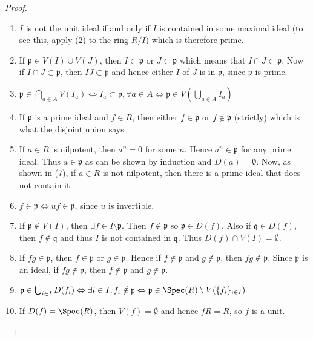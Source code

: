 \begin{proof}
\begin{enumerate}
$S = \{1, f, f^2, \ldots\}$ is a multiplicative subset, not containing $0$.
Take a
prime ideal $\bar{\mathfrak{p}} \subset S^{-1}R$ containing $S^{-1}I$. Then the
pull-back $\mathfrak{p}$ in $R$ of $\bar{\mathfrak{p}}$ is a prime ideal
containing $I$ that does not intersect $S$. This shows that $\bigcap_{I \subset
\mathfrak p} \mathfrak p \subset \sqrt{I}$. Now if $a \in \sqrt{I}$, then $a^n
\in I$ for some $n$. Hence if $I \subset \mathfrak{p}$, then $a^n \in
\mathfrak{p}$. But since $\mathfrak{p}$ is prime, we have $a \in \mathfrak{p}$.
Thus the equality is shown.
\item $I$ is not the unit ideal if and only if $I$
is contained in some maximal ideal (to
see this, apply (2) to the ring $R/I$) which is therefore prime.
\item If $\mathfrak{p} \in V(I) \cup V(J)$, then $I \subset \mathfrak{p}$ or $J
\subset \mathfrak{p}$ which means that $I \cap J \subset \mathfrak{p}$. Now if
$I \cap J \subset \mathfrak{p}$, then $IJ \subset \mathfrak{p}$ and hence
either $I$ of $J$ is in $\mathfrak{p}$, since $\mathfrak{p}$ is prime.
\item $\mathfrak{p} \in \bigcap_{a \in A} V(I_a) \Leftrightarrow
I_a \subset \mathfrak{p}, \forall a \in A \Leftrightarrow
\mathfrak{p} \in V(\bigcup_{a\in A} I_a)$
\item If $\mathfrak{p}$ is a prime ideal and $f \in R$, then either $f \in
\mathfrak{p}$ or $f \notin \mathfrak{p}$ (strictly) which is what the disjoint
union says.
\item If $a \in R$ is nilpotent, then $a^n = 0$ for some $n$. Hence $a^n \in
\mathfrak{p}$ for any prime ideal. Thus $a \in \mathfrak{p}$ as can be shown by
induction and $D(a) = \emptyset$. Now, as shown in (7), if $a \in R$ is not
nilpotent, then there is a prime ideal that does not contain it.
\item $f \in \mathfrak{p} \Leftrightarrow uf \in \mathfrak{p}$, since $u$ is
invertible.
\item If $\mathfrak{p} \notin V(I)$, then $\exists f \in I \setminus
\mathfrak{p}$. Then $f \notin \mathfrak{p}$ so $\mathfrak{p} \in D(f)$. Also if
$\mathfrak{q} \in D(f)$, then $f \notin \mathfrak{q}$ and thus $I$ is not
contained in $\mathfrak{q}$. Thus $D(f) \cap V(I) = \emptyset$.
\item If $fg \in \mathfrak{p}$, then $f \in \mathfrak{p}$ or $g \in
\mathfrak{p}$. Hence if $f \notin \mathfrak{p}$ and $g \notin \mathfrak{p}$,
then $fg \notin \mathfrak{p}$. Since $\mathfrak{p}$ is an ideal, if $fg \notin
\mathfrak{p}$, then $f \notin \mathfrak{p}$ and $g \notin \mathfrak{p}$.
\item $\mathfrak{p} \in \bigcup_{i \in I} D(f_i) \Leftrightarrow \exists i \in
I, f_i \notin \mathfrak{p} \Leftrightarrow \mathfrak{p} \in \Spec(R)
\setminus V(\{f_i\}_{i \in I})$
\item If $D(f) = \Spec(R)$, then $V(f) = \emptyset$ and
hence $fR = R$, so $f$ is a unit.
\end{enumerate}
\end{proof}
